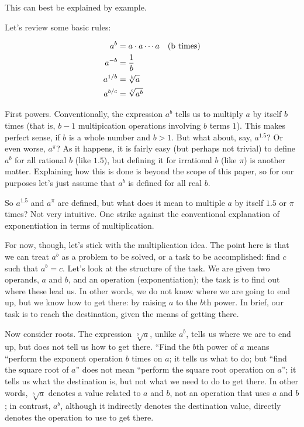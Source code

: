 \documentclass[reqno,12pt]{tufte-book}
\numberwithin{equation}{subsection}
\begin{document}
This can best be explained by example.

Let's review some basic rules:

{
  \begin{alignat}{2}
    a^{b} &= a\cdot a\cdots a \quad \textnormal{(b times)} \\
    a^{-b} &= \frac{1}{b} \\
    a^{1/b} &= \sqrt[b]{a} \\
    a^{b/c} &= \sqrt[c]{a^b}
  \end{alignat}
}

First powers.  Conventionally, the expression $a^b$ tells us to
multiply $a$ by itself $b$ times (that is, $b-1$ multipication
operations involving $b$ terms $1$).  This makes perfect sense, if $b$
is a whole number and $b>1$.  But what about, say, $a^{1.5}$?  Or even
worse, $a^\pi$?  As it happens, it is fairly easy (but perhaps not
trivial) to define $a^b$ for all rational $b$ (like $1.5$), but
defining it for irrational $b$ (like $\pi$) is another matter.
Explaining how this is done is beyond the scope of this paper, so for
our purposes let's just assume that $a^b$ is defined for all real $b$.

So $a^{1.5}$ and $a^\pi$ are defined, but what does it mean to
multiple $a$ by itself $1.5$ or $\pi$ times?  Not very intuitive.  One
strike against the conventional explanation of exponentiation in terms
of multiplication.

For now, though, let's stick with the multiplication idea. The point
here is that we can treat $a^b$ as a problem to be solved, or a task
to be accomplished: find $c$ such that $a^b = c$.  Let's look at the
structure of the task.  We are given two operands, $a$ and $b$, and an
operation (exponentiation); the task is to find out where these lead
us.  In other words, we do not know where we are going to end up, but
we know how to get there: by raising $a$ to the $b$th power.  In
brief, our task is to reach the destination, given the means of
getting there.

Now consider roots.  The expression $\sqrt[b]{a}$, unlike $a^b$, tells
us where we are to end up, but does not tell us how to get there.
``Find the $b$th power of $a$ means ``perform the exponent operation
$b$ times on $a$; it tells us what to do; but ``find the square root
of $a$'' does not mean ``perform the square root operation on $a$'';
it tells us what the destination is, but not what we need to do to get
there.  In other words, $\sqrt[b]{a}$ denotes a value related to $a$
and $b$, not an operation that uses $a$ and $b$; in contrast, $a^b$,
although it indirectly denotes the destination value, directly denotes
the operation to use to get there.
\end{document}
